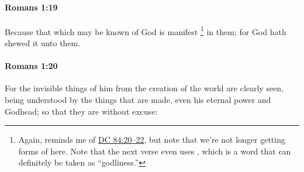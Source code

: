 		\paragraph{Romans 1:19} %
			\label{ROMANS-1-19}

			Because that which may be known of God is manifest%
				\footnote{%
					Again, reminds me of \hyperref[DC84-20]{DC 84:20--22}, but note that we're not longer getting forms of  here. Note that the next verse even uses , which is a word that can definitely be taken as ``godliness.''
					}
			in them; for God hath shewed it unto them.

			\begin{framed}
			\scriptsize
				\begin{compactdesc}
					\item[SBLG] 
				\end{compactdesc}
			\end{framed}

		\paragraph{Romans 1:20} %
			\label{ROMANS-1-20}

			For the invisible things of him from the creation of the world are clearly seen, being understood by the things that are made, even his eternal power and Godhead; so that they are without excuse:


